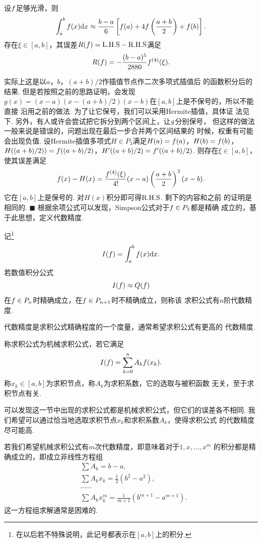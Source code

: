   \begin{pos}[Simpson公式]
    设$\mathnormal{f}$足够光滑，则
    \[
      \int_a^b\mathnormal{f}(x)\mathrm{d} x \approx \frac{b-a}{6}
      \left[ \mathnormal{f}(a) + 4\mathnormal{f}\left(\frac{a+b}{2}\right)+\mathnormal{f}(b) \right].
    \]
    存在$\xi\in[a,b]$，其误差$R(\mathnormal{f})=\text{L.H.S}-\text{R.H.S}$满足
    \[
      R(\mathnormal{f}) = -\frac{(b-a)^5}{2880}\mathnormal{f}^{(4)}(\xi).
    \]
  \end{pos}
  \remark
    实际上这是以$a$，$b$，$(a+b)/2$作插值节点作二次多项式插值后
    的函数积分后的结果. 但是若按照之前的思路证明，会发现$g(x)
    =(x-a)(x-(a+b)/2)(x-b)$在$[a, b]$上是不保号的，所以不能直接
    沿用之前的做法. 为了让它保号，我们可以采用Hermite插值，具体证
    法见下. 另外，有人或许会尝试把它拆分到两个区间上，让$\mathnormal{g}$分别保号，
    但这样的做法一般来说是错误的，问题出现在最后一步合并两个区间结果的
    时候，权重有可能会出现负值.
  \proof
    设Hermite插值多项式$H\in P_3$满足$H(a) = \mathnormal{f}(a)$，$H(b) = \mathnormal{f}(b)$，
    $H((a+b)/2)) = \mathnormal{f}((a+b)/2)$，$H^\prime((a+b)/2) = \mathnormal{f}^\prime((a+b)/2)$.
    则存在$\xi\in[a, b]$，使其误差满足
    \[
      \mathnormal{f}(x) - H(x) = \frac{\mathnormal{f}^{(4)}(\xi)}{4!}(x-a)\left(\frac{a+b}{2}\right)^2(x-b).
    \]
    它在$[a,b]$上是保号的. 对$H(x)$积分即可得$\text{R.H.S}$. 剩下的内容和之前
    的证明是相同的. $\blacksquare$
  \remark
    根据余项公式可以发现，Simpson公式对于$\mathnormal{f}\in P_3$都是精确
    成立的，基于此思想，定义代数精度.

  \begin{defi}[代数精度]
    记\footnote{在以后若不特殊说明，此记号都表示在$[a, b]$上的积分. }
    \[
      I(\mathnormal{f}) = \int_a^b\mathnormal{f}(x)\mathrm{d} x.
    \]
    若数值积分公式
    \[
      I(\mathnormal{f}) \approx Q(\mathnormal{f})
    \]
    在$\mathnormal{f}\in P_n$时精确成立，在$\mathnormal{f}\in P_{n+1}$时不精确成立，则称该
    求积公式有$n$阶代数精度.
  \end{defi}
  \remark
    代数精度是求积公式精确程度的一个度量，通常希望求积公式有更高的
    代数精度.

  \begin{defi}[机械求积公式]
    \label{defi: 机械求积公式}
    称求积公式为机械求积公式，若它满足
    \[
      I(\mathnormal{f}) = \sum_{k=0}^nA_k\mathnormal{f}(x_k).
    \]
    称$x_k\in[a, b]$为求积节点，称$A_k$为求积系数，它的选取与被积函数
    无关，至于求积节点有关.
  \end{defi}
  \remark
    可以发现这一节中出现的求积公式都是机械求积公式，但它们的误差各不相同.
    我们希望可以通过恰当地选取求积节点$x_k$和求积系数$A_k$，使得求积公式
    的代数精度尽可能高. \par
    若我们希望机械求积公式有$m$次代数精度，即意味着对于$1,x,\dots,x^m$
    的积分都是精确成立的，即成立非线性方程组
    \[\begin{split}
      &\sum A_k = b-a,\\
      &\sum A_kx_k = \frac{1}{2}(b^2-a^2),\\
      &\cdots\cdots \\
      &\sum A_kx_k^m = \frac{1}{m+1}(b^{m+1}-a^{m+1}).
    \end{split}\]
    这一方程组求解通常是困难的.

